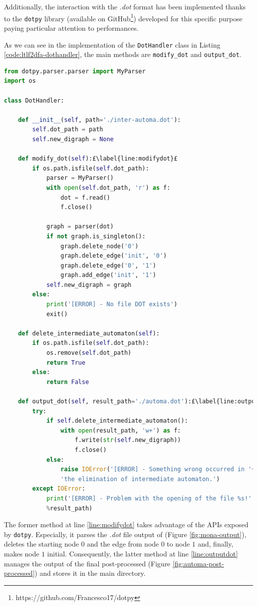 Additionally, the interaction with the \textit{.dot} format has been implemented thanks to the \texttt{dotpy} library (available on GitHub\footnote{https://github.com/Francesco17/dotpy}) developed for this specific purpose paying particular attention to performances.

As we can see in the implementation of the \texttt{DotHandler} class in Listing \ref{code:ltlf2dfa-dothandler}, the main methods are \texttt{modify\_dot} and \texttt{output\_dot}.
\begin{lstlisting}[language=Python, style=Python, escapechar = £, label={code:ltlf2dfa-dothandler}, caption={The \texttt{DotHandler} class.}]
from dotpy.parser.parser import MyParser
import os

class DotHandler:

    def __init__(self, path='./inter-automa.dot'):
        self.dot_path = path
        self.new_digraph = None

    def modify_dot(self):£\label{line:modifydot}£
        if os.path.isfile(self.dot_path):
            parser = MyParser()
            with open(self.dot_path, 'r') as f:
                dot = f.read()
                f.close()

            graph = parser(dot)
            if not graph.is_singleton():
                graph.delete_node('0')
                graph.delete_edge('init', '0')
                graph.delete_edge('0', '1')
                graph.add_edge('init', '1')
            self.new_digraph = graph
        else:
            print('[ERROR] - No file DOT exists')
            exit()

    def delete_intermediate_automaton(self):
        if os.path.isfile(self.dot_path):
            os.remove(self.dot_path)
            return True
        else:
            return False

    def output_dot(self, result_path='./automa.dot'):£\label{line:outputdot}£
        try:
            if self.delete_intermediate_automaton():
                with open(result_path, 'w+') as f:
                    f.write(str(self.new_digraph))
                    f.close()
            else:
                raise IOError('[ERROR] - Something wrong occurred in '+ \
                'the elimination of intermediate automaton.')
        except IOError:
            print('[ERROR] - Problem with the opening of the file %s!' \
            %result_path)
\end{lstlisting}
The former method at line \ref{line:modifydot} takes advantage of the APIs exposed by \texttt{dotpy}. Especially, it parses the \textit{.dot} file output of \MONA (Figure \ref{fig:mona-output}), deletes the starting node $0$ and the edge from node $0$ to node $1$ and, finally, makes node $1$ initial. Consequently, the latter method at line \ref{line:outputdot} manages the output of the final post-processed \DFA (Figure \ref{fig:automa-post-processed}) and stores it in the main directory.
